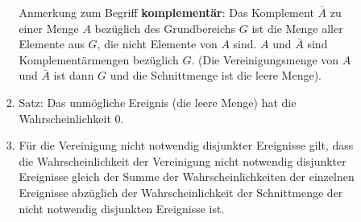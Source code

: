 \documentclass[a4paper,12pt,DIV=15]{scrartcl}
\begin{document}
\begin{enumerate}
\begin{itemize}
\begin{enumerate}
		Anmerkung zum Begriff \textbf{komplementär}: Das Komplement $\bar A$ zu einer Menge $A$ bezüglich des
		Grundbereichs $G$ ist die Menge aller Elemente aus $G$, die nicht Elemente von $A$ sind.
		$A$ und $\bar A$ sind Komplementärmengen bezüglich $G$.
		(Die Vereinigungsmenge von $A$ und $\bar A$ ist dann $G$ und die Schnittmenge ist die leere Menge).
	\item Satz: Das unmögliche Ereignis (die leere Menge) hat die Wahrscheinlichkeit 0.
	\item Für die Vereinigung nicht notwendig disjunkter Ereignisse gilt, dass die
		Wahrscheinlichkeit der Vereinigung nicht notwendig disjunkter Ereignisse gleich der
		Summe der Wahrscheinlichkeiten der einzelnen Ereignisse abzüglich der
		Wahrscheinlichkeit der Schnittmenge der nicht notwendig disjunkten Ereignisse ist.
	\end{enumerate}
\end{itemize}

\end{enumerate}
\end{document}
